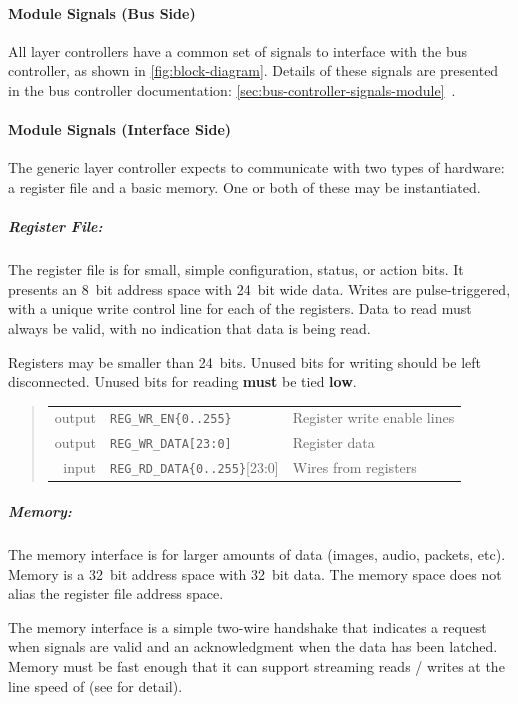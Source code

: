 \paragraph{Module Signals (Bus Side)}
All layer controllers have a common set of signals to interface with the bus
controller, as shown in \autoref{fig:block-diagram}. Details of these
signals are presented in the bus controller documentation:
\ref{sec:bus-controller-signals-module}~.

\paragraph{Module Signals (Interface Side)}
The generic layer controller expects to communicate with two types of
hardware: a register file and a basic memory. One or both of these may be
instantiated.

\subparagraph{Register File:} The register file is for small, simple
configuration, status, or action bits. It presents an 8~bit address space with
24~bit wide data. Writes are pulse-triggered, with a unique write control line
for each of the registers. Data to read must always be valid, with no
indication that data is being read.

Registers may be smaller than 24~bits. Unused bits for writing should be left
disconnected. Unused bits for reading {\bf must} be tied {\bf low}.

\begin{quote}
\begin{tabular}{r l l}
  {\sc output} & {\tt REG\_WR\_EN\{0..255\}} & Register write enable lines \\
  {\sc output} & {\tt REG\_WR\_DATA[23:0]} & Register data \\
  {\sc  input} & {\tt REG\_RD\_DATA\{0..255\}}[23:0] & Wires from registers \\
\end{tabular}
\end{quote}

\subparagraph{Memory:} The memory interface is for larger amounts of data
(images, audio, packets, etc). Memory is a 32~bit address space with 32~bit
data. The memory space does not alias the register file address space.

The memory interface is a simple two-wire handshake that indicates a request
when signals are valid and an acknowledgment when the data has been latched.
Memory must be fast enough that it can support streaming reads / writes at the
line speed of \bus (see  for detail).

